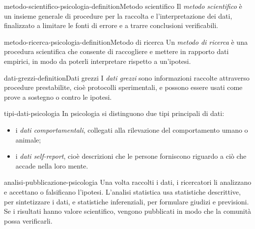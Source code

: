 \documentclass[preview]{standalone}
\begin{document}
\begin{snippetdefinition}{metodo-scientifico-psicologia-definition}{Metodo scientifico}
    Il \emph{metodo scientifico} è un insieme generale di procedure per la
    raccolta e l'interpretazione dei dati, finalizzato a limitare le fonti di
    errore e a trarre conclusioni verificabili.
\end{snippetdefinition}

\begin{snippetdefinition}{metodo-ricerca-psicologia-definition}{Metodo di ricerca}
    Un \emph{metodo di ricerca} è una procedura scientifica che consente di
    raccogliere e mettere in rapporto dati empirici, in modo da poterli
    interpretare rispetto a un'ipotesi.
\end{snippetdefinition}

\begin{snippetdefinition}{dati-grezzi-definition}{Dati grezzi}
    I \emph{dati grezzi} sono informazioni raccolte attraverso procedure
    prestabilite, cioè protocolli sperimentali, e possono essere usati come
    prove a sostegno o contro le ipotesi.
\end{snippetdefinition}

\begin{snippet}{tipi-dati-psicologia}
    In psicologia si distinguono due tipi principali di dati:
    \begin{itemize}
        \item i \emph{dati comportamentali}, collegati alla rilevazione del
        comportamento umano o animale;
        \item i \emph{dati self-report}, cioè descrizioni che le persone
        forniscono riguardo a ciò che accade nella loro mente.
    \end{itemize}
\end{snippet}

\begin{snippet}{analisi-pubblicazione-psicologia}
    Una volta raccolti i dati, i ricercatori li analizzano e accettano o
    falsificano l'ipotesi. L'analisi statistica usa statistiche descrittive,
    per sintetizzare i dati, e statistiche inferenziali, per formulare giudizi
    e previsioni. Se i risultati hanno valore scientifico, vengono pubblicati
    in modo che la comunità possa verificarli.
\end{snippet}
\end{document}
